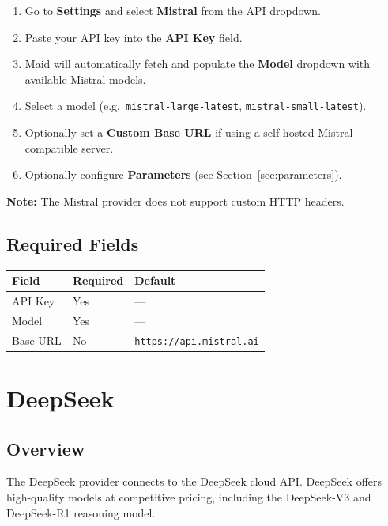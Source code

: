 \documentclass[12pt,a4paper]{article}
\begin{document}
\begin{enumerate}
    \item Go to \textbf{Settings} and select \textbf{Mistral} from the API dropdown.
    \item Paste your API key into the \textbf{API Key} field.
    \item Maid will automatically fetch and populate the \textbf{Model} dropdown with available Mistral models.
    \item Select a model (e.g.\ \texttt{mistral-large-latest}, \texttt{mistral-small-latest}).
    \item Optionally set a \textbf{Custom Base URL} if using a self-hosted Mistral-compatible server.
    \item Optionally configure \textbf{Parameters} (see Section~\ref{sec:parameters}).
\end{enumerate}

\textbf{Note:} The Mistral provider does not support custom HTTP headers.

\subsection{Required Fields}

\begin{center}
\begin{tabular}{lll}
\toprule
\textbf{Field} & \textbf{Required} & \textbf{Default} \\
\midrule
API Key  & Yes & — \\
Model    & Yes & — \\
Base URL & No  & \texttt{https://api.mistral.ai} \\
\bottomrule
\end{tabular}
\end{center}

\section{DeepSeek}

\subsection{Overview}

The DeepSeek provider connects to the DeepSeek cloud API. DeepSeek offers high-quality models at competitive pricing, including the DeepSeek-V3 and DeepSeek-R1 reasoning model.
\end{document}
